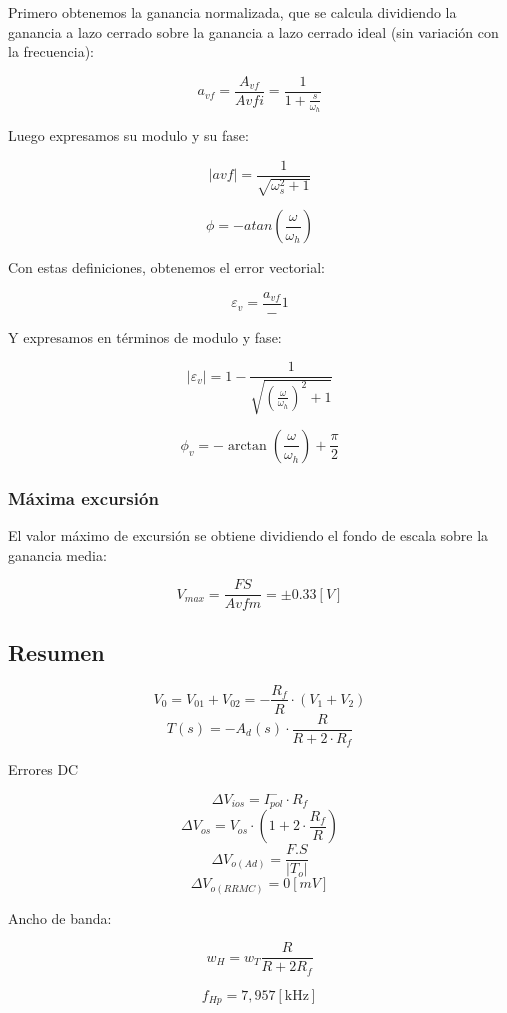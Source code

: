 Primero obtenemos la ganancia normalizada, que se calcula dividiendo la ganancia a lazo cerrado sobre la ganancia a lazo cerrado ideal (sin variación con la frecuencia):

\[ a_{vf} = \frac{A_{vf}}{A{vfi}} = \frac{1}{1 + \frac{s}{\omega_h}} \]

Luego expresamos su modulo y su fase:

\[ |avf| = \frac{1}{\sqrt{\omega^2_s + 1}} \]


\[ \phi = -atan\left(\frac{\omega}{\omega_h}\right) \]

Con estas definiciones, obtenemos el error vectorial:

\[ \varepsilon_v = \frac{a_{vf}} - 1 \]

Y expresamos en términos de modulo y fase:

\[ |\varepsilon_v| = 1 - \frac{1}{\sqrt{\left(\frac{\omega}{\omega_{h}}\right)^2 + 1}} \]

\[ \phi_v = -\arctan\left(\frac{\omega}{\omega_h}\right) + \frac{\pi}{2} \]



\subsubsection{Máxima excursión}
El valor máximo de excursión se obtiene dividiendo el fondo de escala sobre la ganancia media:

\[ V_{max}=\frac{F S}{Avfm} =  \pm 0.33[ V ] \]




\subsection{Resumen}

\[V_{0} = V_{01} + V_{02} = - \frac{R_f}{R} \cdot (V_1 + V_2) \]
\[T (s) = -A_d (s) \cdot  \frac{R}{R + 2\cdot R_f}\]


Errores DC

\[ \Delta V_{ios} = I_{pol}^{-} \cdot R_f \]
\[ \Delta V_{os}  = V_{os} \cdot (1 + 2 \cdot \frac {R_f}{R} )\]
\[ \Delta V_{o (Ad)}=\frac{F.S}{\left|T_{o}\right|}\]
\[ \Delta V_{o (RRMC) } = 0 [ mV ]\]
 
Ancho de banda:

\[ w_H = w_{T} \frac{R}{R+2 R_f} \]

\[ f_{Hp}=7,957[\mathrm{kHz}] \]
 

